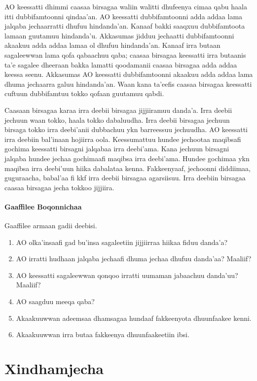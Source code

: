 \documentclass[11pt,b5paper]{book}
\begin{document}
\begin{itemize}
AO keessatti dhimmi caasaa birsagaa waliin walitti dhufeenya  cimaa qabu haala itti dubbifamtoonni qindaa’an. AO keessatti  dubbifamtoonni adda addaa lama jalqaba jechaarratti dhufuu  hindanda’an. Kanaaf bakki saaqxuu dubbifamtoota lamaan  guutamuu hindanda’u. Akkasumas jidduu jechaatti  dubbifamtoonni akaakuu adda addaa lamaa ol dhufuu  hindanda’an. Kanaaf irra butaan sagaleewwan lama qofa  qabaachuu qaba; caasaa birsagaa keessatti irra butaanis ta’e  sagalee dheeraan bakka lamatti qoodamanii caasaa birsagaa  adda addaa keessa seenu. Akkasumas AO keessatti  dubbifamtoonni akaakuu adda addaa lama dhuma jechaarra  galuu hindanda’an. Waan kana ta’eefis caasaa birsagaa  keessatti cuftuun dubbifamtuu tokko qofaan guutamuu qabdi.

Caasaan birsagaa karaa irra deebii birsagaa jijjiiramuu danda'a. Irra deebii jechuun waan tokko, haala tokko dabaluudha. Irra  deebii birsagaa jechuun birsaga tokko irra deebi’anii  dubbachuu ykn barreessuu jechuudha. AO keessatti irra  deebiin bal’inaan hojiirra oola. Keessumattuu hundee jechootaa maqibsafi gochima keessatti birsagni jalqabaa irra deebi’ama.  Kana jechuun birsagni jalqaba hundee jechaa gochimaafi  maqibsa irra deebi’ama. Hundee gochimaa ykn maqibsa irra  deebi’uun hiika dabalataa kenna. Fakkeenyaaf, jechoonni diddiimaa, guguraacha, babal'aa fi kkf irra deebii birsagaa agarsiisuu. Irra deebiin birsagaa caasaa birsagaa jecha tokkoo jijjiira. 

\subsubsection{Gaaffilee Boqonnichaa}

Gaaffilee armaan gadii deebisi.
\begin{enumerate}
  \item AO olka'insaafi gad bu'insa sagaleetiin jijjiirraa hiikaa fiduu danda'a?
  \item AO irratti hudhaan jalqaba jechaafi dhuma jechaa dhufuu danda'aa? Maaliif?
  \item AO keessatti sagaleewwan qonqoo irratti uumaman jabaachuu danda'uu? Maaliif?
  \item AO saagduu meeqa qaba? 
  \item Akaakuuwwan adeemsaa dhamsagaa hundaaf fakkeenyota dhuunfaakee kenni.
  \item Akaakuuwwan irra butaa fakkeenya dhuunfaakeetiin ibsi.
\end{enumerate}

\chapter{Xindhamjecha}
\setlength{\parindent}{3em}


\end{itemize}
\end{document}
